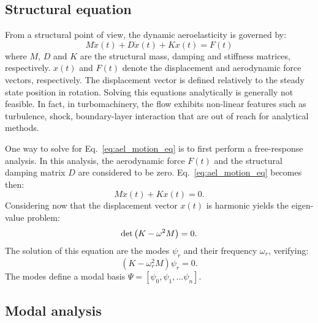 
\subsection{Structural equation}
\label{sub:structural_equation}

From a structural point of view, 
the dynamic aeroelasticity is governed by:
\begin{equation}
	M \ddot{x}(t) + D \dot{x}(t) + K x(t) = F(t)
	\label{eq:ael_motion_eq}
\end{equation}
where $M$, $D$ and $K$ are the structural mass, damping 
and stiffness matrices, respectively.
$x(t)$ and $F(t)$ denote the displacement 
and aerodynamic force vectors, respectively. The displacement
vector is defined relatively to the 
steady state position in rotation.
Solving this equations analytically is generally 
not feasible. In fact, in turbomachinery, 
the flow exhibits non-linear features such as turbulence, shock,
boundary-layer interaction that are out of reach for
analytical methods.

One way to solve for Eq.~\eqref{eq:ael_motion_eq}
is to first perform a free-response analysis.
In this analysis, the aerodynamic force $F(t)$ and
the structural damping matrix $D$ are considered to be zero.
Eq.~\eqref{eq:ael_motion_eq} becomes then:
\begin{equation}
	M \ddot{x}(t) + K x(t) = 0.
	\label{eq:ael_motion_eq_free_response}
\end{equation}
Considering now that the displacement vector $x(t)$ is harmonic
yields the eigen-value problem:
\begin{equation}
	\mdet \left(K - \omega^2 M  \right) = 0.
	\label{eq:ael_motion_eq_eigen_value}
\end{equation}
The solution of this equation are the modes $\psi_r$
and their frequency $\omega_r$, verifying:
\begin{equation}
	\left(K - \omega_r^2 M  \right) \psi_r = 0.
\end{equation}
The modes define a modal basis 
$\Psi = [\psi_0, \psi_1, \dots \psi_n]$.

\subsection{Modal analysis}
\label{sub:modal_analysis}

